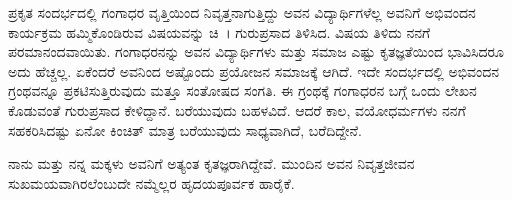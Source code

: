{ಪ್ರಕೃತ ಸಂದರ್ಭದಲ್ಲಿ ಗಂಗಾಧರ ವೃತ್ತಿಯಿಂದ ನಿವೃತ್ತನಾಗುತ್ತಿದ್ದು ಅವನ ವಿದ್ಯಾರ್ಥಿ\-ಗಳೆಲ್ಲ ಅವನಿಗೆ ಅಭಿವಂದನ ಕಾರ್ಯಕ್ರಮ ಹಮ್ಮಿಕೊಂಡಿರುವ ವಿಷಯವನ್ನು ಚಿ~। ಗುರುಪ್ರಸಾದ ತಿಳಿಸಿದ. ವಿಷಯ ತಿಳಿದು ನನಗೆ ಪರಮಾನಂದವಾಯಿತು. ಗಂಗಾಧರನನ್ನು ಅವನ ವಿದ್ಯಾರ್ಥಿಗಳು ಮತ್ತು ಸಮಾಜ ಎಷ್ಟು ಕೃತಜ್ಞತೆಯಿಂದ ಭಾವಿಸಿದರೂ ಅದು ಹೆಚ್ಚಲ್ಲ. ಏಕೆಂದರೆ ಅವನಿಂದ ಅಷ್ಟೊಂದು ಪ್ರಯೋಜನ ಸಮಾಜಕ್ಕೆ ಆಗಿದೆ. ಇದೇ ಸಂದರ್ಭದಲ್ಲಿ ಅಭಿವಂದನ ಗ್ರಂಥವನ್ನೂ ಪ್ರಕಟಿಸುತ್ತಿರುವುದು ಮತ್ತೂ ಸಂತೋಷದ ಸಂಗತಿ. ಈ ಗ್ರಂಥಕ್ಕೆ ಗಂಗಾಧರನ ಬಗ್ಗೆ ಒಂದು ಲೇಖನ ಕೊಡುವಂತೆ ಗುರುಪ್ರಸಾದ ಕೇಳಿದ್ದಾನೆ. ಬರೆಯುವುದು ಬಹಳವಿದೆ. ಆದರೆ ಕಾಲ, ವಯೋಧರ್ಮಗಳು ನನಗೆ ಸಹಕರಿಸಿದಷ್ಟು   \enginline{-}   ಏನೋ ಕಿಂಚಿತ್ ಮಾತ್ರ ಬರೆಯುವುದು ಸಾಧ್ಯವಾಗಿದೆ, ಬರೆದಿದ್ದೇನೆ.  

ನಾನು ಮತ್ತು ನನ್ನ ಮಕ್ಕಳು ಅವನಿಗೆ ಅತ್ಯಂತ ಕೃತಜ್ಞರಾಗಿದ್ದೇವೆ. ಮುಂದಿನ ಅವನ ನಿವೃತ್ತಜೀವನ ಸುಖಮಯವಾಗಿರಲೆಂಬುದೇ ನಮ್ಮೆಲ್ಲರ ಹೃದಯಪೂರ್ವಕ ಹಾರೈಕೆ.

\articleend	
}
